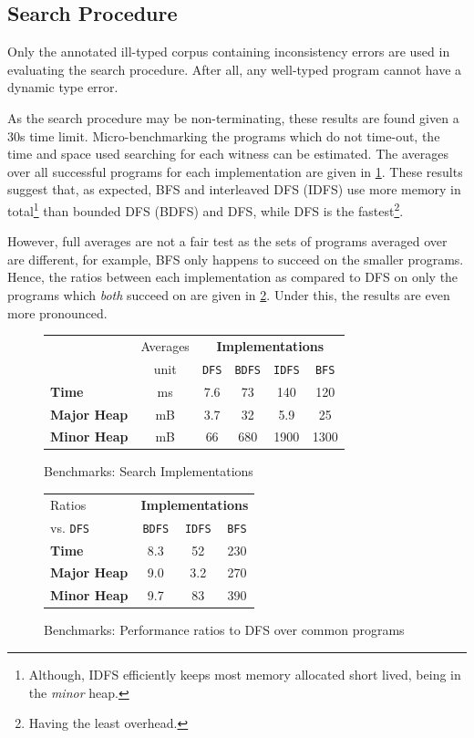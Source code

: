 \subsection{Search Procedure}
Only the annotated ill-typed corpus containing inconsistency errors are used in evaluating the search procedure. After all, any well-typed program cannot have a dynamic type error.

As the search procedure may be non-terminating, these results are found given a 30s time limit. Micro-benchmarking the programs which do not time-out, the time and space used searching for each witness can be estimated. The averages over all successful programs for each implementation are given in \cref{fig:SearchPerformance}. These results suggest that, as expected, BFS and interleaved DFS (IDFS) use more memory in total\footnote{Although, IDFS efficiently keeps most memory allocated short lived, being in the \textit{minor} heap.} than bounded DFS (BDFS) and DFS, while DFS is the fastest\footnote{Having the least overhead.}. 

However, full averages are not a fair test as the sets of programs averaged over are different, for example, BFS only happens to succeed on the smaller programs. Hence, the ratios between each implementation as compared to DFS on only the programs which \textit{both} succeed on are given in \cref{fig:SearchPerformanceRatios}. Under this, the results are even more pronounced.
\begin{figure}
  \centering
  \begin{tabular}{lc|cccc}
  & Averages & \multicolumn{4}{c}{\textbf{Implementations}}\\
   & unit & \texttt{DFS} & \texttt{BDFS} & \texttt{IDFS} & \texttt{BFS}\\
   \hline
   \textbf{Time} & ms &  7.6 & 73 & 140 & 120\\
   \textbf{Major Heap} & mB & 3.7 & 32 & 5.9 & 25\\
   \textbf{Minor Heap} & mB & 66 & 680 & 1900 & 1300
  \end{tabular}
  
\caption{Benchmarks: Search Implementations}
\label{fig:SearchPerformance}
\end{figure}
\begin{figure}
  \centering
  \begin{tabular}{l|ccc}
  Ratios & \multicolumn{3}{c}{\textbf{Implementations}}\\
    vs. \texttt{DFS}& \texttt{BDFS} & \texttt{IDFS} & \texttt{BFS} \\
   \hline
   \textbf{Time} &  8.3 & 52 & 230\\
   \textbf{Major Heap} & 9.0 & 3.2 & 270\\
   \textbf{Minor Heap} & 9.7 & 83 & 390
  \end{tabular}
  
\caption{Benchmarks: Performance ratios to DFS over common programs}
\label{fig:SearchPerformanceRatios}
\end{figure}


